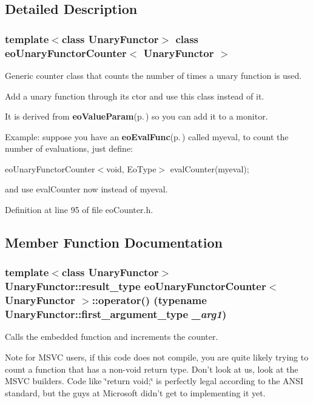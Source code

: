 \subsection{Detailed Description}
\subsubsection*{template$<$class Unary\-Functor$>$ class eo\-Unary\-Functor\-Counter$<$ Unary\-Functor $>$}

Generic counter class that counts the number of times a unary function is used. 

Add a unary function through its ctor and use this class instead of it.

It is derived from {\bf eo\-Value\-Param}{\rm (p.\,\pageref{classeo_value_param})} so you can add it to a monitor.

Example: suppose you have an {\bf eo\-Eval\-Func}{\rm (p.\,\pageref{classeo_eval_func})} called myeval, to count the number of evaluations, just define:

eo\-Unary\-Functor\-Counter$<$void, Eo\-Type$>$ eval\-Counter(myeval);

and use eval\-Counter now instead of myeval. 



Definition at line 95 of file eo\-Counter.h.

\subsection{Member Function Documentation}
\subsubsection{\setlength{\rightskip}{0pt plus 5cm}template$<$class Unary\-Functor$>$ Unary\-Functor::result\_\-type {\bf eo\-Unary\-Functor\-Counter}$<$ Unary\-Functor $>$::operator() (typename Unary\-Functor::first\_\-argument\_\-type {\em \_\-arg1})\hspace{0.3cm}{\tt  [inline]}}\label{classeo_unary_functor_counter_a1}


Calls the embedded function and increments the counter. 

Note for MSVC users, if this code does not compile, you are quite likely trying to count a function that has a non-void return type. Don't look at us, look at the MSVC builders. Code like \char`\"{}return void;\char`\"{} is perfectly legal according to the ANSI standard, but the guys at Microsoft didn't get to implementing it yet.

